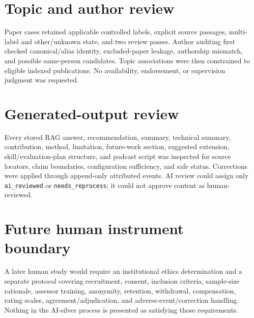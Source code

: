 \section{Topic and author review}

Paper cases retained applicable controlled labels, explicit source passages, multi-label and other/unknown state, and two review passes. Author auditing first checked canonical/alias identity, excluded-paper leakage, authorship mismatch, and possible same-person candidates. Topic associations were then constrained to eligible indexed publications. No availability, endorsement, or supervision judgment was requested.

\section{Generated-output review}

Every stored RAG answer, recommendation, summary, technical summary, contribution, method, limitation, future-work section, suggested extension, skill/evaluation-plan structure, and podcast script was inspected for source locators, claim boundaries, configuration sufficiency, and safe status. Corrections were applied through append-only attributed events. AI review could assign only \texttt{ai\_reviewed} or \texttt{needs\_reprocess}; it could not approve content as human-reviewed.

\section{Future human instrument boundary}

A later human study would require an institutional ethics determination and a separate protocol covering recruitment, consent, inclusion criteria, sample-size rationale, assessor training, anonymity, retention, withdrawal, compensation, rating scales, agreement/adjudication, and adverse-event/correction handling. Nothing in the AI-silver process is presented as satisfying those requirements.
